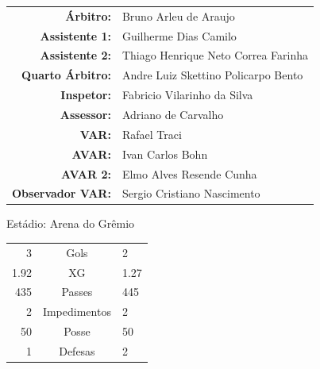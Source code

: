 \documentclass[11pt]{article}
\begin{document}
\vspace{0.5cm}
\begin{minipage}{0.65\textwidth}
\begin{center}
\begin{tabular}{rl}
\textbf{Árbitro:} & Bruno Arleu de Araujo \\
\textbf{Assistente 1:} & Guilherme Dias Camilo \\
\textbf{Assistente 2:} & Thiago Henrique Neto Correa Farinha \\
\textbf{Quarto Árbitro:} & Andre Luiz Skettino Policarpo Bento \\
\textbf{Inspetor:} & Fabricio Vilarinho da Silva \\
\textbf{Assessor:} & Adriano de Carvalho \\
\textbf{VAR:} & Rafael Traci \\
\textbf{AVAR:} & Ivan Carlos Bohn \\
\textbf{AVAR 2:} & Elmo Alves Resende Cunha \\
\textbf{Observador VAR:} & Sergio Cristiano Nascimento \\
\end{tabular}
\end{center}
\end{minipage}
\begin{minipage}{0.3\textwidth}
Estádio: Arena do Grêmio\\
\begin{tabular}{rcl}
3 & Gols & 2 \\
1.92 & XG & 1.27 \\
435 & Passes & 445 \\
2 & Impedimentos & 2 \\
50 & Posse & 50 \\
1 & Defesas & 2 \\
\end{tabular}
\end{minipage}
\newpage
\end{document}
